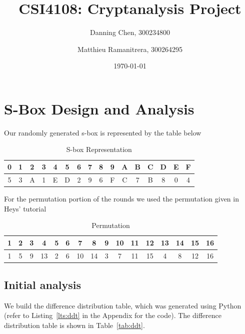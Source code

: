 \documentclass[letterpaper,12pt]{article}
\title{\vspace{3cm}CSI4108: Cryptanalysis Project \vspace{2cm}}
\author{
    Danning Chen, 300234800
    \and
    Matthieu Ramanitrera, 300264295
}
\date{\vspace{2cm}\today}
\begin{document}
\maketitle

\newpage

\section{S-Box Design and Analysis}
Our randomly generated s-box is represented by the table below
    \begin{table}[ht]
        \centering
        \begin{tabular}{|c|c|c|c|c|c|c|c|c|c|c|c|c|c|c|c|}
            \hline
            0 & 1 & 2 & 3 & 4 & 5 & 6 & 7 & 8 & 9 & A & B & C & D & E & F \\
            \hline
            5 & 3 & A & 1 & E & D & 2 & 9 & 6 & F & C & 7 & B & 8 & 0 & 4 \\
            \hline
        \end{tabular}
        \caption{S-box Representation}
        \label{tab:sbox}
    \end{table}


For the permutation portion of the rounds we used the permutation given in Heys' tutorial \cite{heys}
\begin{table}[ht]
    \centering
    \begin{tabular}{|c|c|c|c|c|c|c|c|c|c|c|c|c|c|c|c|}
        \hline
        1 & 2 & 3 & 4 & 5 & 6 & 7 & 8 & 9 & 10 & 11 & 12 & 13 & 14 & 15 & 16 \\
        \hline
        1 & 5 & 9 & 13 & 2 & 6 & 10 & 14 & 3 & 7 & 11 & 15 & 4 & 8 & 12 & 16 \\
        \hline
    \end{tabular}
    \caption{Permutation}
    \label{tab:perm}
\end{table}

\subsection*{Initial analysis}
We build the difference distribution table, which was generated using Python (refer to Listing~\ref{lts:ddt} in the Appendix for the code). The difference distribution table is shown in Table~\ref{tab:ddt}.
\end{document}
